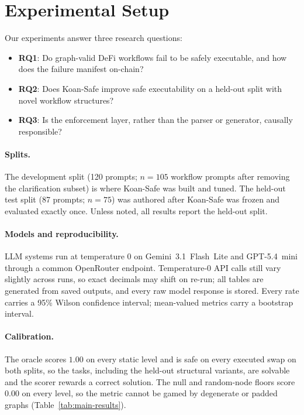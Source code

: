 \section{Experimental Setup}
\label{sec:setup}

Our experiments answer three research questions:
\begin{itemize}
  \item \textbf{RQ1}: Do graph-valid DeFi workflows fail to be safely
        executable, and how does the failure manifest on-chain?
  \item \textbf{RQ2}: Does Koan-Safe improve safe executability on a
        held-out split with novel workflow structures?
  \item \textbf{RQ3}: Is the enforcement layer, rather than the parser or
        generator, causally responsible?
\end{itemize}

\paragraph{Splits.} The development split (120 prompts; $n=105$ workflow
prompts after removing the clarification subset) is where Koan-Safe was
built and tuned. The held-out test split (87 prompts; $n=75$) was
authored after Koan-Safe was frozen and evaluated exactly once. Unless
noted, all results report the held-out split.

\paragraph{Models and reproducibility.} LLM systems run at temperature
$0$ on Gemini~3.1~Flash~Lite and GPT-5.4~mini through a common OpenRouter
endpoint. Temperature-$0$ API calls still vary slightly across runs, so
exact decimals may shift on re-run; all tables are generated from saved
outputs, and every raw model response is stored. Every rate carries a
95\% Wilson confidence interval; mean-valued metrics carry a bootstrap
interval.

\paragraph{Calibration.} The oracle scores $1.00$ on every static level
and is safe on every executed swap on both splits, so the tasks,
including the held-out structural variants, are solvable and the scorer
rewards a correct solution. The null and random-node floors score $0.00$
on every level, so the metric cannot be gamed by degenerate or padded
graphs (Table~\ref{tab:main-results}).

